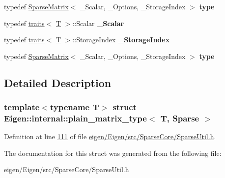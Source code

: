 \begin{DoxyCompactItemize}
\mbox{\label{struct_eigen_1_1internal_1_1plain__matrix__type_3_01_t_00_01_sparse_01_4_aa58945e4be9a73cd2b6388ba5928c33b}} 
typedef \hyperlink{group___sparse_core___module_class_eigen_1_1_sparse_matrix}{Sparse\+Matrix}$<$ \+\_\+\+Scalar, \+\_\+\+Options, \+\_\+\+Storage\+Index $>$ {\bfseries type}
\item 
\mbox{\label{struct_eigen_1_1internal_1_1plain__matrix__type_3_01_t_00_01_sparse_01_4_a18510fea488fb8c93b18fcf63b0765a0}} 
typedef \hyperlink{struct_eigen_1_1internal_1_1traits}{traits}$<$ \hyperlink{group___sparse_core___module}{T} $>$\+::Scalar {\bfseries \+\_\+\+Scalar}
\item 
\mbox{\label{struct_eigen_1_1internal_1_1plain__matrix__type_3_01_t_00_01_sparse_01_4_adbc2fc3f639bed115439b45259050bb1}} 
typedef \hyperlink{struct_eigen_1_1internal_1_1traits}{traits}$<$ \hyperlink{group___sparse_core___module}{T} $>$\+::Storage\+Index {\bfseries \+\_\+\+Storage\+Index}
\item 
\mbox{\label{struct_eigen_1_1internal_1_1plain__matrix__type_3_01_t_00_01_sparse_01_4_aa58945e4be9a73cd2b6388ba5928c33b}} 
typedef \hyperlink{group___sparse_core___module_class_eigen_1_1_sparse_matrix}{Sparse\+Matrix}$<$ \+\_\+\+Scalar, \+\_\+\+Options, \+\_\+\+Storage\+Index $>$ {\bfseries type}
\end{DoxyCompactItemize}


\subsection{Detailed Description}
\subsubsection*{template$<$typename T$>$\newline
struct Eigen\+::internal\+::plain\+\_\+matrix\+\_\+type$<$ T, Sparse $>$}



Definition at line \hyperlink{eigen_2_eigen_2src_2_sparse_core_2_sparse_util_8h_source_l00111}{111} of file \hyperlink{eigen_2_eigen_2src_2_sparse_core_2_sparse_util_8h_source}{eigen/\+Eigen/src/\+Sparse\+Core/\+Sparse\+Util.\+h}.



The documentation for this struct was generated from the following file\+:\begin{DoxyCompactItemize}
\item 
eigen/\+Eigen/src/\+Sparse\+Core/\+Sparse\+Util.\+h\end{DoxyCompactItemize}
